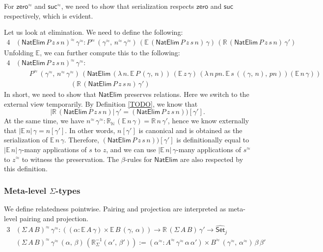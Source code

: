 \documentclass[acmsmall]{acmart}
\newcommand{\mit}[1]{\mathit{#1}}
\newcommand{\msf}[1]{\mathsf{#1}}
\newcommand{\mbb}[1]{\mathbb{#1}}
\newcommand{\wh}[1]{\widehat{#1}}
\newcommand{\zero}{\msf{zero}}
\newcommand{\suc}{\msf{suc}}
\newcommand{\Set}{\mathsf{Set}}
\newcommand{\ev}{\mbb{E}}
\newcommand{\re}{\mbb{R}}
\theoremstyle{remark}
\newcommand{\whset}{\wh{\Set}}
\newcommand{\rel}{^{\approx}}
\begin{document}
For $\zero\rel$ and $\suc\rel$, we need to show that serialization respects
$\zero$ and $\suc$ respectively, which is evident.

Let us look at elimination. We need to define the following:
\begin{alignat*}{4}
  &(\msf{NatElim}\,P\,z\,s\,n)\rel\,\gamma\rel :
  P\rel\,(\gamma\rel,\,n\rel\,\gamma\rel)\,(\ev\,(\msf{NatElim}\,P\,z\,s\,n)\,\gamma)\,
                                           (\re\,(\msf{NatElim}\,P\,z\,s\,n)\,\gamma')
\end{alignat*}
Unfolding $\ev$, we can further compute this to the following:
\begin{alignat*}{4}
  &(\msf{NatElim}\,P\,z\,s\,n)\rel\,\gamma\rel : \\
  &\hspace{2em}P\rel\,(\gamma\rel,\,n\rel\,\gamma\rel)\,
  (\msf{NatElim}\,(\lambda\,n.\,\ev\,P\,(\gamma,\,n))\,
                  (\ev\,z\,\gamma)\,
                  (\lambda\,n\,\mit{pn}.\,\ev\,s\,((\gamma,\,n),\,\mit{pn}))
                  (\ev\,n\,\gamma))\\
  &\hspace{8em}(\re\,(\msf{NatElim}\,P\,z\,s\,n)\,\gamma')
\end{alignat*}
In short, we need to show that $\msf{NatElim}$ preserves relations. Here we
switch to the external view temporarily. By Definition \ref{TODO}, we know that
\[
   |\re\,(\msf{NatElim}\,P\,z\,s\,n)|\,\gamma' = (\msf{NatElim}\,P\,z\,s\,n))[\gamma'].
\]
At the same time, we have $n\rel\,\gamma\rel : \re_{\mbb{N}}\,(\ev\,n\,\gamma) =
\re\,n\,\gamma'$, hence we know externally that $|\ev\,n|\,\gamma = n[\gamma']$.
In other words, $n[\gamma']$ is canonical and is obtained as the serialization
of $\ev\,n\,\gamma$. Therefore, $(\msf{NatElim}\,P\,z\,s\,n))[\gamma']$ is
definitionally equal to $|\ev\,n|\,\gamma$-many applications of $s$ to
$z$, and we can use $|\ev\,n|\,\gamma$-many applications of $s\rel$ to $z\rel$
to witness the preservation. The $\beta$-rules for $\msf{NatElim}$ are also respected
by this definition.

\subsubsection{Meta-level $\Sigma$-types} We define relatedness pointwise. Pairing and projection
are interpreted as meta-level pairing and projection.
\begin{alignat*}{3}
  &(\Sigma\,A\,B)\rel\,\gamma\rel : ((\alpha : \ev\,A\,\gamma) \times \ev\,B\,(\gamma,\,\alpha))
             \to \re\,(\Sigma\,A\,B)\,\gamma' \to \whset_j\\
  &(\Sigma\,A\,B)\rel\,\gamma\rel\,(\alpha,\,\beta)\,(\re_{\Sigma}^{-1}(\alpha',\,\beta')) :=
             (\alpha\rel : A\rel\,\gamma\rel\,\alpha\,\alpha') \times B\rel\,(\gamma\rel,\,\alpha\rel)\,\beta\,\beta'
\end{alignat*}
\end{document}
